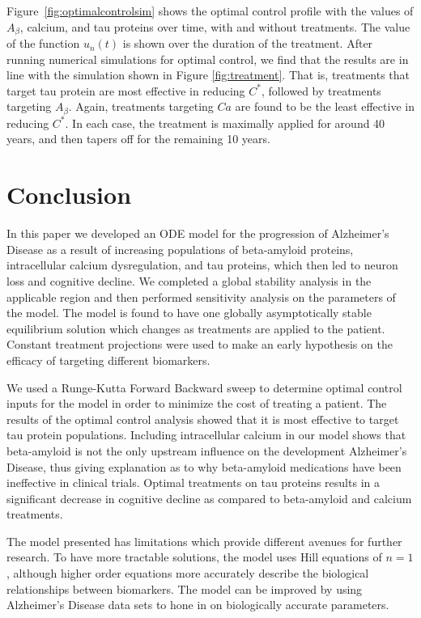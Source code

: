 \documentclass[12pt]{article}
\theoremstyle{definition}
\begin{document}
Figure~\ref{fig:optimalcontrolsim} shows the optimal control profile with the values of $A_\beta$, calcium, and tau proteins over time, with and without treatments. The value of the function $u_n(t)$ is shown over the duration of the treatment. After running numerical simulations for optimal control, we find that the results are in line with the simulation shown in Figure \ref{fig:treatment}. That is, treatments that target tau protein are most effective in reducing $C^*$, followed by treatments targeting $A_\beta$. Again, treatments targeting $Ca$ are found to be the least effective in reducing $C^*$. In each case, the treatment is maximally applied for around 40 years, and then tapers off for the remaining 10 years. \bigskip

\section{Conclusion}

In this paper we developed an ODE model for the progression of Alzheimer's Disease as a result of increasing populations of beta-amyloid proteins, intracellular calcium dysregulation, and tau proteins, which then led to neuron loss and cognitive decline. We completed a global stability analysis in the applicable region and then performed sensitivity analysis on the parameters of the model. The model is found to have one globally asymptotically stable equilibrium solution which changes as treatments are applied to the patient. Constant treatment projections were used to make an early hypothesis on the efficacy of targeting different biomarkers.

We used a Runge-Kutta Forward Backward sweep to determine optimal control inputs for the model in order to minimize the cost of treating a patient. The results of the optimal control analysis showed that it is most effective to target tau protein populations. Including intracellular calcium in our model shows that beta-amyloid is not the only upstream influence on the development Alzheimer's Disease, thus giving explanation as to why beta-amyloid medications have been ineffective in clinical trials. Optimal treatments on tau proteins results in a significant decrease in cognitive decline as compared to beta-amyloid and calcium treatments.

The model presented has limitations which provide different avenues for further research. To have more tractable solutions, the model uses Hill equations of $n=1$, although higher order equations more accurately describe the biological relationships between biomarkers. The model can be improved by using Alzheimer's Disease data sets to hone in on biologically accurate parameters.

\printbibliography
\end{document}
